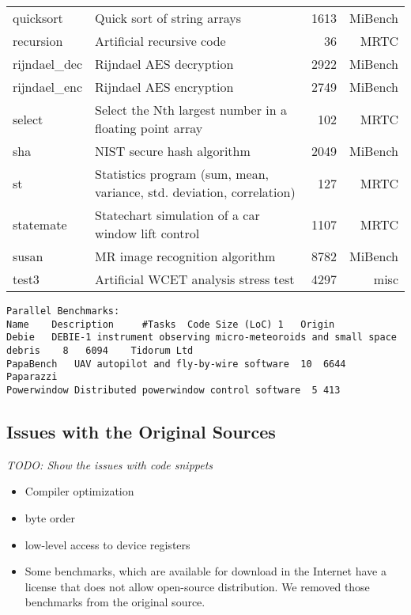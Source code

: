 \documentclass[a4paper,UKenglish]{oasics}
\newcommand{\todo}[1]{{\emph{TODO: #1}}}
\begin{document}
\begin{center}
\begin{longtable}{lp{5cm}rr}
    quicksort &  Quick sort of string arrays  & 1613 & MiBench \\
    recursion &  Artificial recursive code  & 36 & MRTC \\
    rijndael\_dec & Rijndael AES decryption  & 2922 & MiBench \\
    rijndael\_enc & Rijndael AES encryption  & 2749 & MiBench \\
    select & Select the Nth largest number in a floating point array  & 102 & MRTC \\
    sha &  NIST secure hash algorithm & 2049  & MiBench \\
    st & Statistics program (sum, mean, variance, std. deviation, correlation)  & 127  & MRTC \\
    statemate &  Statechart simulation of a car window lift control & 1107 & MRTC \\
    susan &  MR image recognition algorithm & 8782 & MiBench \\
    test3 &  Artificial WCET analysis stress test & 4297 & misc \\
\end{longtable}
\end{center}


\begin{verbatim}
Parallel Benchmarks:
Name 	Description 	#Tasks 	Code Size (LoC) 1 	Origin
Debie 	DEBIE-1 instrument observing micro-meteoroids and small space debris 	8 	6094 	Tidorum Ltd
PapaBench 	UAV autopilot and fly-by-wire software 	10 	6644 	Paparazzi
Powerwindow Distributed powerwindow control software  5 413
\end{verbatim}


\subsection{Issues with the Original Sources}


\todo{Show the issues with code snippets}

\begin{itemize}
\item Compiler optimization
\item byte order
\item low-level access to device registers
\item Some benchmarks, which are available for download in the Internet have a license that
does not allow open-source distribution. We removed those benchmarks from the original source.
\end{itemize}
\end{document}
